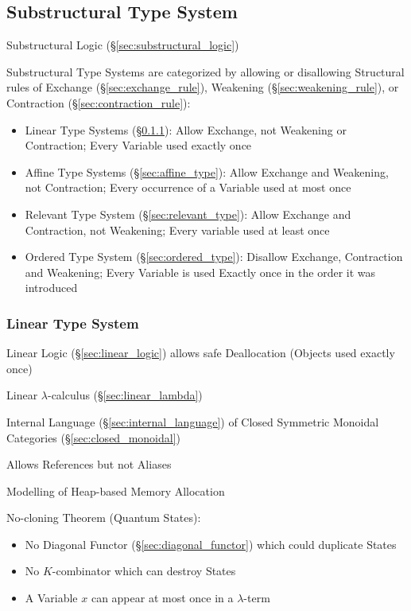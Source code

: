 \subsection{Substructural Type System}\label{sec:substructural_type}

Substructural Logic (\S\ref{sec:substructural_logic})

Substructural Type Systems are categorized by allowing or disallowing
Structural rules of Exchange (\S\ref{sec:exchange_rule}), Weakening
(\S\ref{sec:weakening_rule}), or Contraction
(\S\ref{sec:contraction_rule}):

\begin{itemize}
  \item Linear Type Systems (\S\ref{sec:linear_type}): Allow Exchange,
    not Weakening or Contraction; Every Variable used exactly once
  \item Affine Type Systems (\S\ref{sec:affine_type}): Allow Exchange
    and Weakening, not Contraction; Every occurrence of a Variable
    used at most once
  \item Relevant Type System (\S\ref{sec:relevant_type}): Allow
    Exchange and Contraction, not Weakening; Every variable used at
    least once
  \item Ordered Type System (\S\ref{sec:ordered_type}): Disallow
    Exchange, Contraction and Weakening; Every Variable is used
    Exactly once in the order it was introduced
\end{itemize}



\subsubsection{Linear Type System}\label{sec:linear_type}

Linear Logic (\S\ref{sec:linear_logic}) allows safe Deallocation
(Objects used exactly once)

Linear $\lambda$-calculus (\S\ref{sec:linear_lambda})

Internal Language (\S\ref{sec:internal_language}) of Closed Symmetric
Monoidal Categories (\S\ref{sec:closed_monoidal})

Allows References but not Aliases

Modelling of Heap-based Memory Allocation

No-cloning Theorem (Quantum States):
\begin{itemize}
  \item No Diagonal Functor (\S\ref{sec:diagonal_functor})
    which could duplicate States
  \item No $K$-combinator which can destroy States
  \item A Variable $x$ can appear at most once in a $\lambda$-term
\end{itemize}



